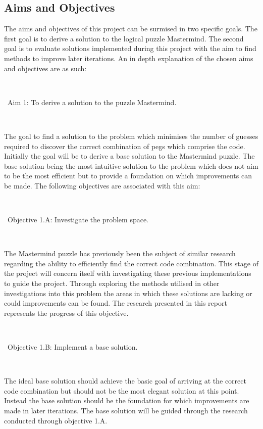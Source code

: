 \documentclass[12pt]{article}  %
\theoremstyle{definition}
\theoremstyle{remark}
\begin{document}
\subsection {Aims and Objectives}
The aims and objectives of this project can be surmised in two specific goals. The first goal is to derive a solution to the logical puzzle 
Mastermind. The second goal is to evaluate solutions implemented during this project with the aim to find methods to improve later 
iterations. An in depth explanation of the chosen aims and objectives are as such:

\

\textbullet\ Aim 1: To derive a solution to the puzzle Mastermind.

\

The goal to find a solution to the problem which minimises the number of guesses required to discover the correct combination of
pegs which comprise the code. Initially the goal will be to derive a base solution to the Mastermind puzzle. The base solution being the
most intuitive solution to the problem which does not aim to be the most efficient but to provide a foundation on which improvements
can be made. The following objectives are associated with this aim:

\

\textbullet\ Objective 1.A: Investigate the problem space.

\

The Mastermind puzzle has previously been the subject of similar research regarding the ability to efficiently find the correct code
combination. This stage of the project will concern itself with investigating these previous implementations to guide the project.
Through exploring the methods utilised in other investigations into this problem the areas in which these solutions are lacking or could
improvements can be found. The research presented in this report represents the progress of this objective.

\

\textbullet\ Objective 1.B:  Implement a base solution.

\

The ideal base solution should achieve the basic goal of arriving at the correct code combination but should not be the most elegant
solution at this point. Instead the base solution should be the foundation for which improvements are made in later iterations.
The base solution will be guided through the research conducted through objective 1.A.
\end{document}
